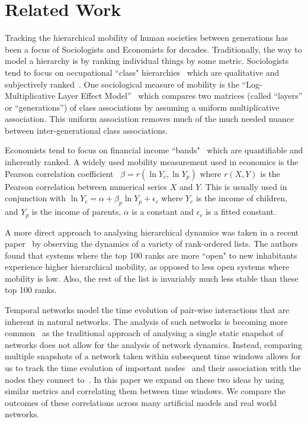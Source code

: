 \section{Related Work}
\label{sec:related_work}
Tracking the hierarchical mobility of human societies between generations has been a focus of Sociologists and Economists for decades. Traditionally, the way to model a hierarchy is by ranking individual things by some metric. Sociologists tend to focus on occupational ``class" hierarchies~\cite{Szreter1984TheOccupations} which are qualitative and subjectively ranked~\cite{Erikson1992TheFlux}. One sociological measure of mobility is the ``Log-Multiplicative Layer Effect Model''~\cite{Breen2004SocialEurope} which compares two matrices (called ``layers'' or ``generations'') of class associations by assuming a uniform multiplicative association. This uniform association removes much of the much needed nuance between inter-generational class associations. 

Economists tend to focus on financial income ``bands"~\cite{Mayer2005HasChanged} which are quantifiable and inherently ranked. A widely used mobility measurement used in economics is the Pearson correlation coefficient~\cite{Solon2001IntergenerationalMobility}
$\beta = r(\ln{Y_c},\ln{Y_p})$
where $r(X,Y)$ is the Pearson correlation between numerical series $X$ and $Y$. This is usually used in conjunction with
$\ln{Y_c} = \alpha + \beta_p\ln{Y_p} + \epsilon_c$
where $Y_c$ is the income of children, and $Y_p$ is the income of parents, $\alpha$ is a constant and $\epsilon_c$ is a fitted constant. 

A more direct approach to analysing hierarchical dynamics was taken in a recent paper~\cite{iniguez2022dynamics} by observing the dynamics of a variety of rank-ordered lists. The authors found that systems where the top 100 ranks are more ``open" to new inhabitants experience higher hierarchical mobility, as opposed to less open systems where mobility is low. Also, the rest of the list is invariably much less stable than these top 100 ranks.

Temporal networks model the time evolution of pair-wise interactions that are inherent in natural networks. The analysis of such networks is becoming more common~\cite{masuda2016guide} as the traditional approach of analysing a single static snapshot of networks does not allow for the analysis of network dynamics. Instead, comparing multiple snapshots of a network taken within subsequent time windows allows for us to track the time evolution of important nodes~\cite{Fire2020TheTime,Nsour2020Hot-Get-RicherModel} and their association with the nodes they connect to~\cite{Zhou2020UniversalNetworks,pedreschi2022temporal}. In this paper we expand on these two ideas by using similar metrics and correlating them between time windows. We compare the outcomes of these correlations across many artificial models and real world networks.

